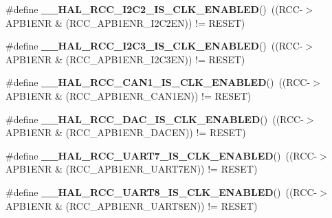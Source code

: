 \begin{DoxyCompactItemize}
\#define {\bfseries \+\_\+\+\_\+\+H\+A\+L\+\_\+\+R\+C\+C\+\_\+\+I2\+C2\+\_\+\+I\+S\+\_\+\+C\+L\+K\+\_\+\+E\+N\+A\+B\+L\+ED}()~((R\+CC-\/$>$A\+P\+B1\+E\+NR \& (R\+C\+C\+\_\+\+A\+P\+B1\+E\+N\+R\+\_\+\+I2\+C2\+EN)) != R\+E\+S\+ET)
\item 
\mbox{\label{group___r_c_c_ex___peripheral___clock___enable___disable___status_gae291bd8b020dff7ea7f52fec61aa3f9d}} 
\#define {\bfseries \+\_\+\+\_\+\+H\+A\+L\+\_\+\+R\+C\+C\+\_\+\+I2\+C3\+\_\+\+I\+S\+\_\+\+C\+L\+K\+\_\+\+E\+N\+A\+B\+L\+ED}()~((R\+CC-\/$>$A\+P\+B1\+E\+NR \& (R\+C\+C\+\_\+\+A\+P\+B1\+E\+N\+R\+\_\+\+I2\+C3\+EN)) != R\+E\+S\+ET)
\item 
\mbox{\label{group___r_c_c_ex___peripheral___clock___enable___disable___status_ga33330d380c0f0c7b3122e86aa3a1ae2c}} 
\#define {\bfseries \+\_\+\+\_\+\+H\+A\+L\+\_\+\+R\+C\+C\+\_\+\+C\+A\+N1\+\_\+\+I\+S\+\_\+\+C\+L\+K\+\_\+\+E\+N\+A\+B\+L\+ED}()~((R\+CC-\/$>$A\+P\+B1\+E\+NR \& (R\+C\+C\+\_\+\+A\+P\+B1\+E\+N\+R\+\_\+\+C\+A\+N1\+EN)) != R\+E\+S\+ET)
\item 
\mbox{\label{group___r_c_c_ex___peripheral___clock___enable___disable___status_ga22c9af6855a6f9f9c947497908adcc9f}} 
\#define {\bfseries \+\_\+\+\_\+\+H\+A\+L\+\_\+\+R\+C\+C\+\_\+\+D\+A\+C\+\_\+\+I\+S\+\_\+\+C\+L\+K\+\_\+\+E\+N\+A\+B\+L\+ED}()~((R\+CC-\/$>$A\+P\+B1\+E\+NR \& (R\+C\+C\+\_\+\+A\+P\+B1\+E\+N\+R\+\_\+\+D\+A\+C\+EN)) != R\+E\+S\+ET)
\item 
\mbox{\label{group___r_c_c_ex___peripheral___clock___enable___disable___status_gaf6beaa399462e32b4052ff3428f17710}} 
\#define {\bfseries \+\_\+\+\_\+\+H\+A\+L\+\_\+\+R\+C\+C\+\_\+\+U\+A\+R\+T7\+\_\+\+I\+S\+\_\+\+C\+L\+K\+\_\+\+E\+N\+A\+B\+L\+ED}()~((R\+CC-\/$>$A\+P\+B1\+E\+NR \& (R\+C\+C\+\_\+\+A\+P\+B1\+E\+N\+R\+\_\+\+U\+A\+R\+T7\+EN)) != R\+E\+S\+ET)
\item 
\mbox{\label{group___r_c_c_ex___peripheral___clock___enable___disable___status_gab3b6d673061453f062ba13bf6a28742a}} 
\#define {\bfseries \+\_\+\+\_\+\+H\+A\+L\+\_\+\+R\+C\+C\+\_\+\+U\+A\+R\+T8\+\_\+\+I\+S\+\_\+\+C\+L\+K\+\_\+\+E\+N\+A\+B\+L\+ED}()~((R\+CC-\/$>$A\+P\+B1\+E\+NR \& (R\+C\+C\+\_\+\+A\+P\+B1\+E\+N\+R\+\_\+\+U\+A\+R\+T8\+EN)) != R\+E\+S\+ET)

\end{DoxyCompactItemize}
